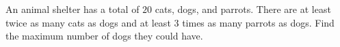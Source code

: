An animal shelter has a total of $20$ cats, dogs, and parrots. There are at least twice as many cats as dogs and at least 3 times as many parrots as dogs. Find the maximum number of dogs they could have.
